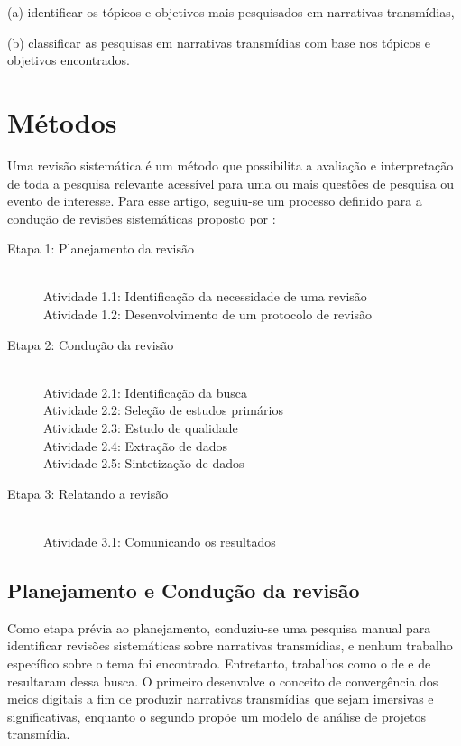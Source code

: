 \documentclass[
article,			%
11pt,				%
oneside,			%
a4paper,			%
english,			%
brazil,				%
sumario=tradicional
]{abntex2}
\begin{document}
  (a) identificar os tópicos e objetivos mais pesquisados em narrativas transmídias,

  (b) classificar as pesquisas em narrativas transmídias com base nos tópicos e objetivos encontrados.

  \section{Métodos}
  \label{sec-metodos}

  Uma revisão sistemática é um método que possibilita a avaliação e interpretação de toda a pesquisa relevante acessível para uma ou mais questões de pesquisa ou evento de interesse. Para esse artigo, seguiu-se um processo definido para a condução de revisões sistemáticas proposto por :

  \begin{description}
    \item[Etapa 1: Planejamento da revisão] \hfill \\
    Atividade 1.1: Identificação da necessidade de uma revisão \\
    Atividade 1.2: Desenvolvimento de um protocolo de revisão
    \item[Etapa 2: Condução da revisão] \hfill \\
    Atividade 2.1: Identificação da busca \\
    Atividade 2.2: Seleção de estudos primários \\
    Atividade 2.3: Estudo de qualidade \\
    Atividade 2.4: Extração de dados \\
    Atividade 2.5: Sintetização de dados
    \item[Etapa 3: Relatando a revisão] \hfill \\
    Atividade 3.1: Comunicando os resultados
  \end{description}

  \subsection{Planejamento e Condução da revisão}
  \label{subsec-planejamento}

  Como etapa prévia ao planejamento, conduziu-se uma pesquisa manual para identificar revisões sistemáticas sobre narrativas transmídias, e nenhum trabalho específico sobre o tema foi encontrado. Entretanto, trabalhos como o de  e de  resultaram dessa busca. O primeiro desenvolve o conceito de convergência dos meios digitais a fim de produzir narrativas transmídias que sejam imersivas e significativas, enquanto o segundo propõe um modelo de análise de projetos transmídia.
\end{document}
